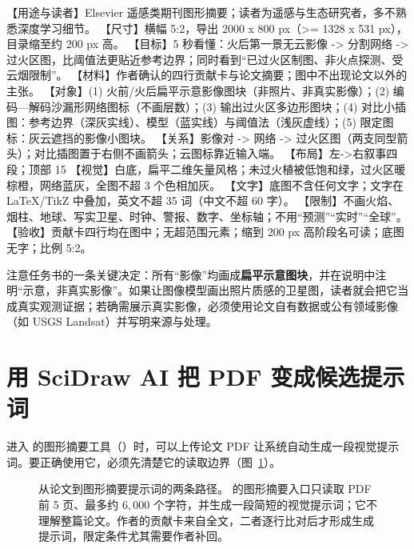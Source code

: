 \begin{Prompt}
【用途与读者】Elsevier 遥感类期刊图形摘要；读者为遥感与生态研究者，多不熟悉深度学习细节。
【尺寸】横幅 5:2，导出 2000 x 800 px（>= 1328 x 531 px），目录缩至约 200 px 高。
【目标】5 秒看懂：火后第一景无云影像 -> 分割网络 -> 过火区图，比阈值法更贴近参考边界；同时看到“已过火区制图、非火点探测、受云烟限制”。
【材料】作者确认的四行贡献卡与论文摘要；图中不出现论文以外的主张。
【对象】(1) 火前/火后扁平示意影像图块（非照片、非真实影像）；(2) 编码—解码沙漏形网络图标（不画层数）；(3) 输出过火区多边形图块；(4) 对比小插图：参考边界（深灰实线）、模型（蓝实线）与阈值法（浅灰虚线）；(5) 限定图标：灰云遮挡的影像小图块。
【关系】影像对 -> 网络 -> 过火区图（两支同型箭头）；对比插图置于右侧不画箭头；云图标靠近输入端。
【布局】左->右叙事四段；顶部 15%
【视觉】白底，扁平二维矢量风格；未过火植被低饱和绿，过火区暖棕橙，网络蓝灰，全图不超 3 个色相加灰。
【文字】底图不含任何文字；文字在 LaTeX/TikZ 中叠加，英文不超 35 词（中文不超 60 字）。
【限制】不画火焰、烟柱、地球、写实卫星、时钟、警报、数字、坐标轴；不用“预测”“实时”“全球”。
【验收】贡献卡四行均在图中；无超范围元素；缩到 200 px 高阶段名可读；底图无字；比例 5:2。
\end{Prompt}

注意任务书的一条关键决定：所有“影像”均画成\textbf{扁平示意图块}，并在说明中注明“示意，非真实影像”。如果让图像模型画出照片质感的卫星图，读者就会把它当成真实观测证据；若确需展示真实影像，必须使用论文自有数据或公有领域影像（如 USGS Landsat）并写明来源与处理。

\section{用 SciDraw AI 把 PDF 变成候选提示词}

进入 \scidraw{} 的图形摘要工具（）时，可以上传论文 PDF 让系统自动生成一段视觉提示词。要正确使用它，必须先清楚它的读取边界（图~\ref{fig:ch10-02}）。

\begin{figure}[htbp]\centering
\resizebox{\linewidth}{!}{}
\caption{从论文到图形摘要提示词的两条路径。\scidraw{} 的图形摘要入口只读取 PDF 前 5 页、最多约 $6{,}000$ 个字符，并生成一段简短的视觉提示词；它不理解整篇论文。作者的贡献卡来自全文，二者逐行比对后才形成生成提示词，限定条件尤其需要作者补回。}\label{fig:ch10-02}
\end{figure}

